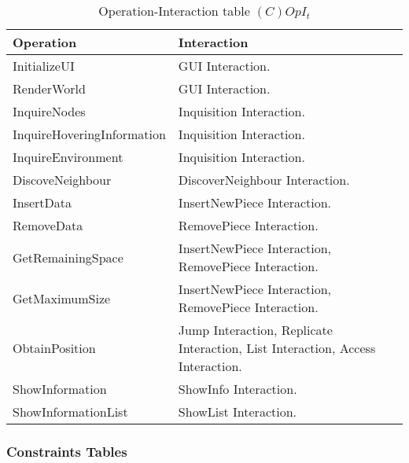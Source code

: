 \begin{table}[H]
	\centering
	\begin{tabular}{|p{5cm}|p{7cm}|}
			\hline
			\textbf{Operation} & \textbf{Interaction} \\
			\hline
			InitializeUI & GUI Interaction. \\
			\hline
			RenderWorld & GUI Interaction. \\
			\hline
			InquireNodes & Inquisition Interaction. \\
			\hline
			InquireHoveringInformation & Inquisition Interaction. \\
			\hline
			InquireEnvironment & Inquisition Interaction. \\
			\hline
			DiscoveNeighbour & DiscoverNeighbour Interaction. \\
			\hline
			InsertData & InsertNewPiece Interaction. \\
			\hline
			RemoveData &  RemovePiece Interaction. \\
			\hline
			GetRemainingSpace & InsertNewPiece Interaction, RemovePiece Interaction.  \\
			\hline
			GetMaximumSize & InsertNewPiece Interaction, RemovePiece Interaction.  \\
			\hline
			ObtainPosition & Jump Interaction, Replicate Interaction, List
			Interaction, Access Interaction.  \\
			\hline
			ShowInformation & ShowInfo Interaction.  \\
			\hline
			ShowInformationList & ShowList Interaction.  \\
			\hline
		\end{tabular}
	\caption{Operation-Interaction table $(C)OpI_t$}
	\label{tab:opit}
\end{table}

\subsubsection{Constraints Tables}


